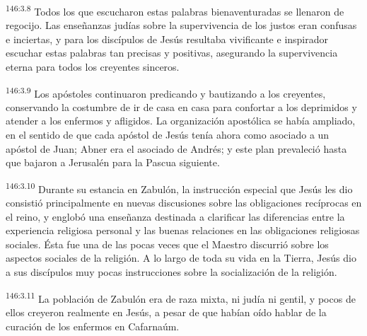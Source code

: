 \par 
\textsuperscript{146:3.8} Todos los que escucharon estas palabras bienaventuradas se llenaron de regocijo. Las enseñanzas judías sobre la supervivencia de los justos eran confusas e inciertas, y para los discípulos de Jesús resultaba vivificante e inspirador escuchar estas palabras tan precisas y positivas, asegurando la supervivencia eterna para todos los creyentes sinceros.

\par 
\textsuperscript{146:3.9} Los apóstoles continuaron predicando y bautizando a los creyentes, conservando la costumbre de ir de casa en casa para confortar a los deprimidos y atender a los enfermos y afligidos. La organización apostólica se había ampliado, en el sentido de que cada apóstol de Jesús tenía ahora como asociado a un apóstol de Juan; Abner era el asociado de Andrés; y este plan prevaleció hasta que bajaron a Jerusalén para la Pascua siguiente.

\par 
\textsuperscript{146:3.10} Durante su estancia en Zabulón, la instrucción especial que Jesús les dio consistió principalmente en nuevas discusiones sobre las obligaciones recíprocas en el reino, y englobó una enseñanza destinada a clarificar las diferencias entre la experiencia religiosa personal y las buenas relaciones en las obligaciones religiosas sociales. Ésta fue una de las pocas veces que el Maestro discurrió sobre los aspectos sociales de la religión. A lo largo de toda su vida en la Tierra, Jesús dio a sus discípulos muy pocas instrucciones sobre la socialización de la religión.

\par 
\textsuperscript{146:3.11} La población de Zabulón era de raza mixta, ni judía ni gentil, y pocos de ellos creyeron realmente en Jesús, a pesar de que habían oído hablar de la curación de los enfermos en Cafarnaúm.

